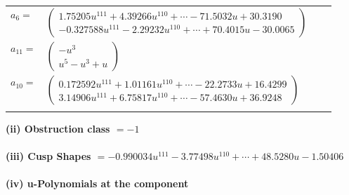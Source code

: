 \documentclass[1p]{elsarticle_modified}
\theoremstyle{definition}
\begin{document}
\begin{tabular}{m{7pt} m{180pt} m{7pt} m{180pt} }
\flushright $a_{6}=$&$\begin{pmatrix}1.75205 u^{111}+4.39266 u^{110}+\cdots-71.5032 u+30.3190\\-0.327588 u^{111}-2.29232 u^{110}+\cdots+70.4015 u-30.0065\end{pmatrix}$ \\
\flushright $a_{11}=$&$\begin{pmatrix}- u^3\\u^5- u^3+u\end{pmatrix}$ \\
\flushright $a_{10}=$&$\begin{pmatrix}0.172592 u^{111}+1.01161 u^{110}+\cdots-22.2733 u+16.4299\\3.14906 u^{111}+6.75817 u^{110}+\cdots-57.4630 u+36.9248\end{pmatrix}$\\&\end{tabular}
\flushleft \textbf{(ii) Obstruction class $= -1$}\\~\\
\flushleft \textbf{(iii) Cusp Shapes $= -0.990034 u^{111}-3.77498 u^{110}+\cdots+48.5280 u-1.50406$}\\~\\
\newpage\renewcommand{\arraystretch}{1}
\flushleft \textbf{(iv) u-Polynomials at the component}\newline \\
\end{document}

